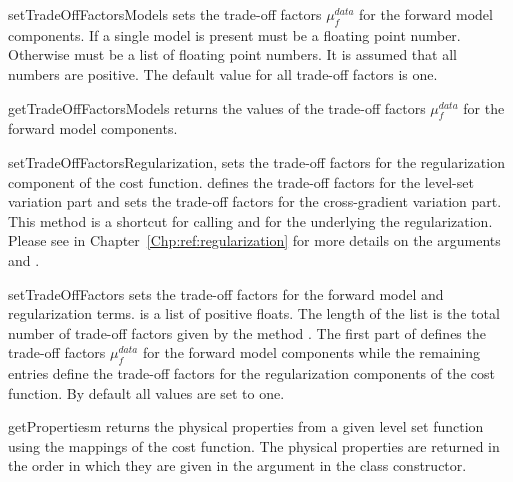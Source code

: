 \begin{methoddesc}[InversionCostFunction]{setTradeOffFactorsModels}{}
sets the trade-off factors $\mu^{data}_{f}$ for the forward model components.
If a single model is present  must be a floating point number.
Otherwise  must be a list of floating point numbers.
It is assumed that all numbers are positive.
The default value for all trade-off factors is one.
\end{methoddesc}

\begin{methoddesc}[InversionCostFunction]{getTradeOffFactorsModels}{}
returns the values of the trade-off factors $\mu^{data}_{f}$ for the forward model components.
\end{methoddesc}

\begin{methoddesc}[InversionCostFunction]{setTradeOffFactorsRegularization}{, }
sets the trade-off factors for the regularization component of the cost function.
 defines the trade-off factors for the level-set variation part and
 sets the trade-off factors for the cross-gradient variation part.
This method is a shortcut for calling 
and  for the underlying the
regularization.
Please see  in Chapter~\ref{Chp:ref:regularization} for
more details on the arguments  and .
\end{methoddesc}
        
\begin{methoddesc}[InversionCostFunction]{setTradeOffFactors}{}
sets the trade-off factors for the forward model and regularization terms.
 is a list of positive floats. The length of the list is the total
number of trade-off factors given by the method .
The first part of  defines the trade-off factors $\mu^{data}_{f}$
for the forward model components while the remaining entries define the
trade-off factors for the regularization components of the cost function.
By default all values are set to one.
\end{methoddesc}

\begin{methoddesc}[InversionCostFunction]{getProperties}{m}
returns the physical properties from a given level set function 
using the mappings of the cost function. The physical properties are
returned in the order in which they are given in the  argument
in the class constructor.
\end{methoddesc}

